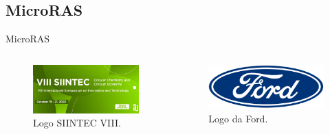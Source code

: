 \subsection*{MicroRAS}
\begin{frame}{MicroRAS}
    \begin{columns}
        \begin{column}{0.4\textwidth}
            \begin{figure}
                \centering
                \includegraphics[height = 0.35\textheight]{img/siintec.jpeg}
                \caption{Logo SIINTEC VIII.}
            \end{figure}
        \end{column}

        \begin{column}{0.4\textwidth}
            \begin{figure}
                \centering
                \includegraphics[height = 0.25\textheight]{img/ford.png}
                \caption{Logo da Ford.}
            \end{figure}
        \end{column}

    \end{columns}
\end{frame}


